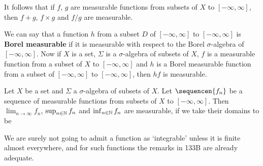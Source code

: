  It follows that if $f$, $g$ are measurable
functions from subsets of $X$ to $[-\infty,\infty]$, then $f+g$,
$f\times g$ and $f/g$ are measurable.   

 We can say that a function $h$ from a subset $D$ of $[-\infty,\infty]$ to $[-\infty,\infty]$ is {\bf Borel measurable} if it is
measurable with respect to the
Borel $\sigma$-algebra of $[-\infty,\infty]$.
Now if $X$ is a set, $\Sigma$ is a
$\sigma$-algebra of subsets of $X$, $f$ is a measurable function from a
subset of $X$ to $[-\infty,\infty]$ and $h$ is a Borel measurable
function from a subset of
$[-\infty,\infty]$ to $[-\infty,\infty]$, then $hf$ is measurable.

 Let $X$ be a set and $\Sigma$ a
$\sigma$-algebra of subsets of $X$.   Let $\sequencen{f_n}$ be a
sequence of measurable functions from subsets of $X$ to
$[-\infty,\infty]$.   Then $\lim_{n\to\infty}f_n$,
$\sup_{n\in\Bbb N}f_n$ and $\inf_{n\in\Bbb N}f_n$ are measurable,
if we take their domains to be




 We are
surely not going to admit a function as `integrable' unless it is
finite almost everywhere, and for such functions the remarks in 133B are
already adequate.

